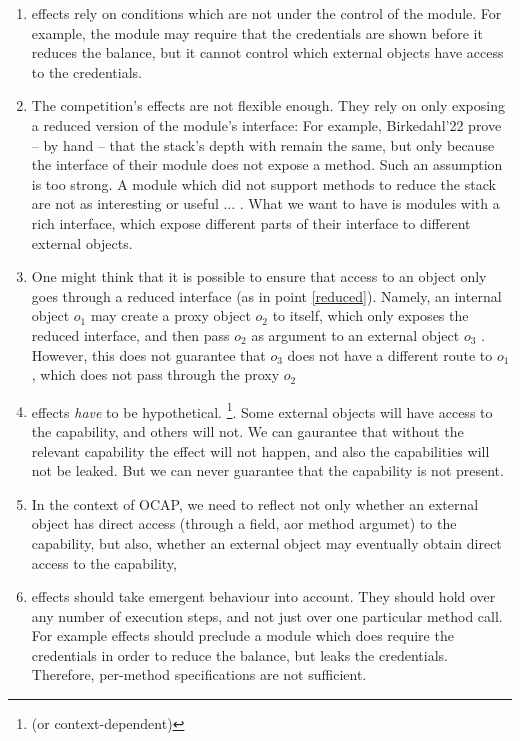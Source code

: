  \vspace{.8cm}
 \begin{enumerate}
 \item
\Tamed effects rely on conditions which are not under the control of the module. 
For example, the module may require that the credentials are shown before it reduces the balance, but it cannot control which external objects have access to the credentials. 
\item
\label{reduced}
The competition's effects  are not flexible enough. 
They rely on only exposing a reduced version of the module's interface:
For example, Birkedahl'22   prove -- by  hand -- that the stack's depth with remain the same, but only because the interface of their module does not expose a  method. 
Such an assumption is too strong. 
A module which did not support methods to reduce the stack are not as interesting or useful ... .
What we want to have is modules with a rich interface, which expose different parts  of their interface to different external objects.
\item
One might think that it is possible to ensure that access to an object only goes through a reduced interface (as in point  \ref{reduced}).
Namely, an internal object $o_1$ may create a proxy object $o_2$ to itself, which only exposes the reduced interface, and then pass $o_2$ as  argument to an external object $o_3$ .
However, this does not guarantee that $o_3$ does not have a different route to $o_1$, which does not pass through the proxy $o_2$
\item
\Tamed effects \emph{have} to be hypothetical. \footnote{ (or context-dependent)}.  
Some external objects will have access to the capability, and others will not. 
We can gaurantee that without the relevant capability the effect will not happen, and also the capabilities will not be leaked. 
But we can never guarantee that the capability is not present.
\item
In the context of OCAP, we need to reflect not only whether an external object has direct access (through a field, aor method  argumet) to the capability, but also, whether an external object may eventually obtain  direct access to the capability,
\item
\Tamed effects should take emergent behaviour into account. 
They should hold over any number of execution steps, and not just over one particular method call. 
For example \tamed effects should preclude  a module which does require the credentials in order to reduce the balance, but leaks the credentials. Therefore, per-method specifications are not sufficient.
\end{enumerate}


